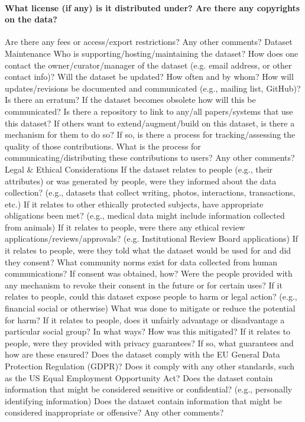 \documentclass{article}
\begin{document}
\begin{multicols}{2}
\paragraph{What license (if any) is it distributed under? Are there
any copyrights on the data?}
Are there any fees or access/export restrictions?
Any other comments?
Dataset Maintenance
Who is supporting/hosting/maintaining the dataset?
How does one contact the owner/curator/manager of the
dataset (e.g. email address, or other contact info)?
Will the dataset be updated? How often and by whom?
How will updates/revisions be documented and communicated (e.g., mailing list, GitHub)? Is there an erratum?
If the dataset becomes obsolete how will this be communicated?
Is there a repository to link to any/all papers/systems
that use this dataset?
If others want to extend/augment/build on this dataset,
is there a mechanism for them to do so? If so, is there
a process for tracking/assessing the quality of those contributions. What is the process for communicating/distributing
these contributions to users?
Any other comments?
Legal \& Ethical Considerations
If the dataset relates to people (e.g., their attributes) or
was generated by people, were they informed about the
data collection? (e.g., datasets that collect writing, photos,
interactions, transactions, etc.)
If it relates to other ethically protected subjects, have
appropriate obligations been met? (e.g., medical data
might include information collected from animals)
If it relates to people, were there any ethical review applications/reviews/approvals? (e.g. Institutional Review
Board applications)
If it relates to people, were they told what the dataset
would be used for and did they consent? What community norms exist for data collected from human communications? If consent was obtained, how? Were the people
provided with any mechanism to revoke their consent in the
future or for certain uses?
If it relates to people, could this dataset expose people
to harm or legal action? (e.g., financial social or otherwise)
What was done to mitigate or reduce the potential for harm?
If it relates to people, does it unfairly advantage or disadvantage a particular social group? In what ways? How
was this mitigated?
If it relates to people, were they provided with privacy
guarantees? If so, what guarantees and how are these
ensured?
Does the dataset comply with the EU General Data Protection Regulation (GDPR)? Does it comply with any other
standards, such as the US Equal Employment Opportunity
Act?
Does the dataset contain information that might be considered sensitive or confidential? (e.g., personally identifying information)
Does the dataset contain information that might be considered inappropriate or offensive?
Any other comments?

\end{multicols}
\end{document}

